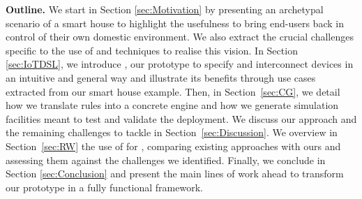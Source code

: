 \noindent
\textbf{Outline.} We start in Section \ref{sec:Motivation} by presenting an archetypal scenario of a smart house to highlight the usefulness to bring end-users back in control of their own domestic \IOT environment. We also extract the crucial \IOT challenges specific to the use of \DSLS and \MDE techniques to realise this vision. In Section \ref{sec:IoTDSL}, we introduce \IOTDSL, our prototype \DSL to specify and interconnect devices in an intuitive and general way and illustrate its benefits through use cases extracted from our smart house example. Then, in Section~\ref{sec:CG}, we detail how we translate \IOTDSL rules into a concrete \CEP engine and how we generate simulation facilities meant to test and validate the \IOT deployment. We discuss our approach and the remaining challenges to tackle in Section~\ref{sec:Discussion}. We overview in Section~\ref{sec:RW} the use of \DSLS for \IOT, comparing existing approaches with ours and assessing them against the challenges we identified. Finally, we conclude in Section \ref{sec:Conclusion} and present the main lines of work ahead to transform our prototype in a fully functional \DSL framework.
